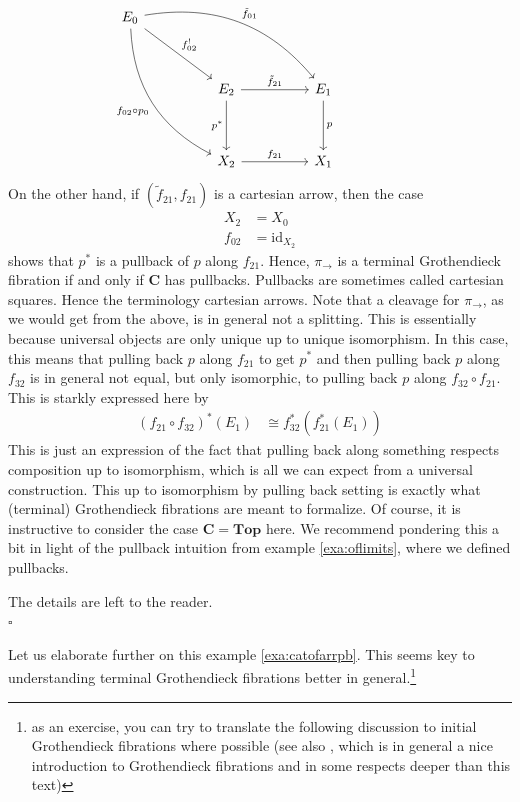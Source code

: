 \begin{exa}
\[\begin{tikzcd}[sep=huge]
  E_{0}
  \arrow[bend left=30]{drr}{\tilde{f}_{01}}
  \arrow{dr}{f_{02}^{!}}
  \arrow[swap,bend right=30]{ddr}{f_{02} \circ p_{0}}
  &
  &
  &
  \\
  &
  E_{2}
  \arrow{r}{\tilde{f}_{21}}
  \arrow[swap]{d}{p^{\ast}}
  &
  E_{1}
  \arrow{d}{p}
  \\
  &
  X_{2}
  \arrow{r}{f_{21}}
  &
  X_{1}
\end{tikzcd}
\]
On the other hand, if $(\tilde{f}_{21},f_{21})$ is a cartesian arrow, then the case
\begin{align*}
  X_{2}
  &=
  X_{0}
  \\
  f_{02}
  &=
  \mathrm{id}_{X_{2}}
\end{align*}
shows that $p^{\ast}$ is a pullback of $p$ along $f_{21}$.
Hence, $\pi_{\rightarrow}$ is a terminal Grothendieck fibration if and only if $\mathbf{C}$ has pullbacks.
Pullbacks are sometimes called cartesian squares.
Hence the terminology {\glqq}cartesian arrows{\grqq}.
Note that a cleavage for $\pi_{\rightarrow}$, as we would get from the above, is in general not a splitting.
This is essentially because universal objects are only unique up to unique isomorphism.
In this case, this means that pulling back $p$ along $f_{21}$ to get $p^{\ast}$ and then pulling back $p$ along $f_{32}$ is in general not equal, but only isomorphic, to pulling back $p$ along $f_{32} \circ f_{21}$.
This is starkly expressed here by
\begin{align*}
  \left(
    f_{21}
    \circ
    f_{32}
  \right)^{\ast}
  (E_{1})
  &\cong
  f_{32}^{\ast}
  \left(
    f_{21}^{\ast}(E_{1})
  \right)
\end{align*}
This is just an expression of the fact that pulling back along something respects composition up to isomorphism, which is all we can expect from a universal construction.
This {\glqq}up to isomorphism by pulling back{\grqq} setting is exactly what (terminal) Grothendieck fibrations are meant to formalize.
Of course, it is instructive to consider the case $\mathbf{C} = \mathbf{Top}$ here.
We recommend pondering this a bit in light of the pullback intuition from example \ref{exa:oflimits}, where we defined pullbacks.
\end{exa}
\begin{prf}
The details are left to the reader.
\\
\phantom{proven}
\hfill
$\square$
\end{prf}
Let us elaborate further on this example \ref{exa:catofarrpb}.
This seems key to understanding terminal Grothendieck fibrations better in general.\footnote{as an exercise, you can try to translate the following discussion to initial Grothendieck fibrations where possible (see also \cite{ab8cfa22}, which is in general a nice introduction to Grothendieck fibrations and in some respects deeper than this text)}
